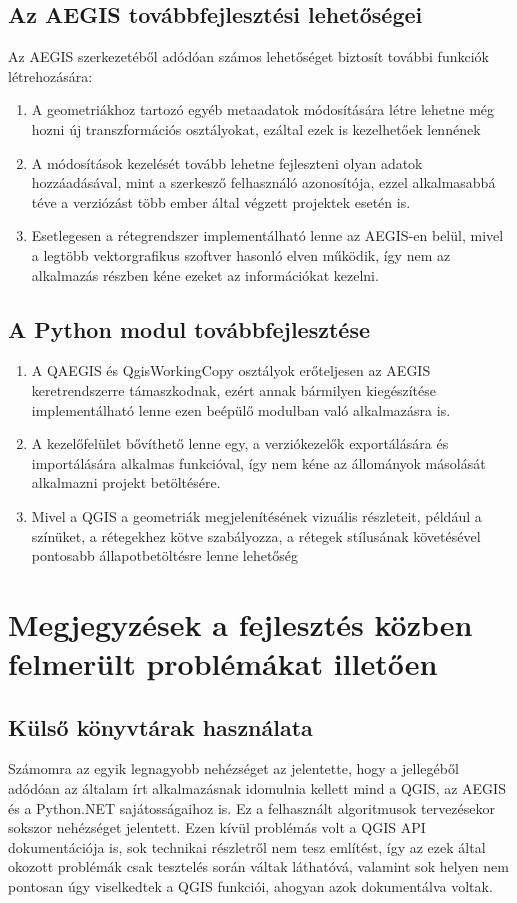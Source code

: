 \subsection{Az AEGIS továbbfejlesztési lehetőségei}
Az AEGIS szerkezetéből adódóan számos lehetőséget biztosít további funkciók létrehozására:
\begin{enumerate}
	\item A geometriákhoz tartozó egyéb metaadatok módosítására létre lehetne még hozni új transzformációs osztályokat, ezáltal ezek is kezelhetőek lennének
	\item A módosítások kezelését tovább lehetne fejleszteni olyan adatok hozzáadásával, mint a szerkesző felhasználó azonosítója, ezzel alkalmasabbá téve a verziózást több ember által végzett projektek esetén is.
	\item Esetlegesen a rétegrendszer implementálható lenne az AEGIS-en belül, mivel a legtöbb vektorgrafikus szoftver hasonló elven működik, így nem az alkalmazás részben kéne ezeket az információkat kezelni.
\end{enumerate}
\subsection{A Python modul továbbfejlesztése}
\begin{enumerate}
	\item A QAEGIS és QgisWorkingCopy osztályok erőteljesen az AEGIS keretrendszerre támaszkodnak, ezért annak bármilyen kiegészítése implementálható lenne ezen beépülő modulban való alkalmazásra is.
	\item A kezelőfelület bővíthető lenne egy, a verziókezelők exportálására és importálására alkalmas funkcióval, így nem kéne az állományok másolását alkalmazni projekt betöltésére.
	\item Mivel a QGIS a geometriák megjelenítésének vizuális részleteit, például a színüket, a rétegekhez kötve szabályozza, a rétegek stílusának követésével pontosabb állapotbetöltésre lenne lehetőség
\end{enumerate}

\section{Megjegyzések a fejlesztés közben felmerült problémákat illetően}
\subsection{Külső könyvtárak használata}
Számomra az egyik legnagyobb nehézséget az jelentette, hogy a jellegéből adódóan az általam írt alkalmazásnak idomulnia kellett mind a QGIS, az AEGIS és a Python.NET sajátosságaihoz is. Ez a felhasznált algoritmusok tervezésekor sokszor nehézséget jelentett. Ezen kívül problémás volt a QGIS API dokumentációja is, sok technikai részletről nem tesz említést, így az ezek által okozott problémák csak tesztelés során váltak láthatóvá, valamint sok helyen nem pontosan úgy viselkedtek a QGIS funkciói, ahogyan azok dokumentálva voltak.
